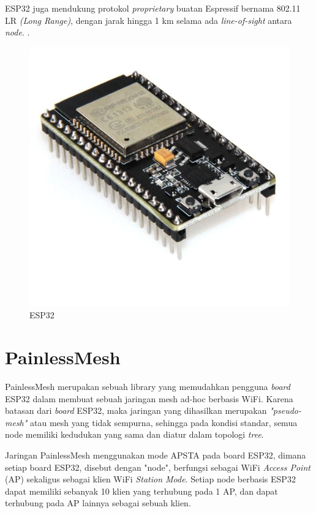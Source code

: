 ESP32 juga mendukung protokol \textit{proprietary} buatan Espressif bernama 802.11 LR \textit{(Long Range)}, dengan jarak hingga 1 km selama ada \textit{line-of-sight} antara \textit{node}. \cite{WiFiDriverESP32}.
\begin{figure}[h]
	\centering
	\includegraphics[scale=0.1]{./assets/ESP32}
	\caption{ESP32}
\end{figure}

\section{PainlessMesh}
PainlessMesh merupakan sebuah library yang memudahkan pengguna \textit{board} ESP32 dalam membuat sebuah jaringan mesh ad-hoc berbasis WiFi. Karena batasan dari \textit{board} ESP32, maka jaringan yang dihasilkan merupakan \textit{"pseudo-mesh"} atau mesh yang tidak sempurna, sehingga pada kondisi standar, semua node memiliki kedudukan yang sama dan diatur dalam topologi \textit{tree}.

Jaringan PainlessMesh menggunakan mode APSTA pada board ESP32, dimana setiap board ESP32, disebut dengan "node", berfungsi sebagai WiFi \textit{Access Point} (AP) sekaligus sebagai klien WiFi \textit{Station Mode}. Setiap node berbasis ESP32 dapat memiliki sebanyak 10 klien yang terhubung pada 1 AP, dan dapat terhubung pada AP lainnya sebagai sebuah klien.


